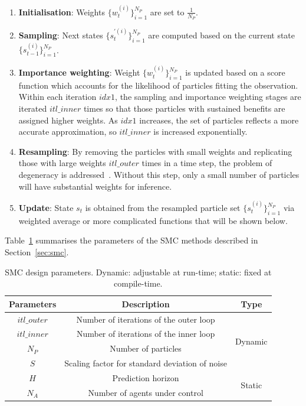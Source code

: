 \begin{enumerate}
\item \textbf{Initialisation}: Weights $\{w_t^{(i)}\}^{N_P}_{i=1}$ are set to $\frac{1}{N_P}$.
\item \textbf{Sampling}: Next states $\{s_t^{'(i)}\}^{N_P}_{i=1}$ are computed based on the current state $\{s_{t-1}^{(i)}\}^{N_P}_{i=1}$.
\item \textbf{Importance weighting}: Weight $\{w_t^{(i)}\}^{N_P}_{i=1}$ is updated based on a score function which accounts for the likelihood of particles fitting the observation.
Within each iteration $idx1$, the sampling and importance weighting stages are iterated $itl\_inner$ times so that those particles with sustained benefits are assigned higher weights.
As $idx1$ increases, the set of particles reflects a more accurate approximation, so $itl\_inner$ is increased exponentially.
\item \textbf{Resampling}: By removing the particles with small weights and replicating those with large weights
$itl\_outer$ times in a time step, the problem of degeneracy is addressed~\cite{kitagawa96}. Without this step, only a small number of particles will have substantial weights for inference.
\item \textbf{Update}: State $s_t$ is obtained from the resampled particle set $\{s_t^{(i)}\}^{N_P}_{i=1}$ via weighted average or more complicated functions that will be shown below.
\end{enumerate}

Table~\ref{tab:parameters} summarises the parameters of the SMC methods described in Section~\ref{sec:smc}.

\begin{table}
	\setlength{\tabcolsep}{3pt}
	\begin{spacing}{1.0}
	\caption{SMC design parameters. Dynamic: adjustable at run-time; static: fixed at compile-time.}
	\label{tab:parameters}
	\footnotesize
	\centering
	\smallskip
		\begin{tabular}{c|c|c}
			\hline
			 Parameters & Description & Type\\
			\hline
			\hline
			$itl\_outer$ & Number of iterations of the outer loop & \multirow{4}{*}{Dynamic}\\
			$itl\_inner$ & Number of iterations of the inner loop &\\
			$N_P$ & Number of particles &\\
			$S$ & Scaling factor for standard deviation of noise &\\
			\hline
			$H$ & Prediction horizon & \multirow{2}{*}{Static}\\
			$N_A$ & Number of agents under control &\\
			\hline
		\end{tabular}
		\end{spacing}
\end{table}


